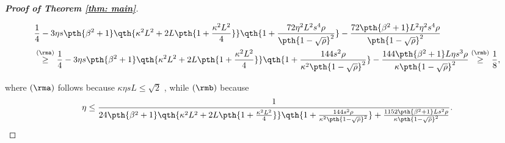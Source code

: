 \documentclass[letterpaper, 10 pt, conference]{ieeeconf}  %
\begin{document}
\begin{proof}[\bf Proof of Theorem \ref{thm: main}]
\begin{footnotesize}
\begin{align*}
    &\frac{1}{4} - 3\eta s\pth{\beta^2 + 1}\qth{\kappa^2 L^2 + 2 L \pth{1 + \frac{\kappa^2 L^2}{4}}}\qth{1 + \frac{72 \eta^2 L^2 s^4 \rho}{\pth{1-\sqrt{\rho}}^2}}-\frac{72 \pth{\beta^2 + 1} L^2 \eta^2 s^4 \rho}{\pth{1-\sqrt{\rho}}^2} \\
    &\overset{(\rma)}{\ge}\frac{1}{4} - 3\eta s\pth{\beta^2 + 1}\qth{\kappa^2 L^2 + 2 L \pth{1 + \frac{\kappa^2 L^2}{4}}}\qth{1 + \frac{144 s^2 \rho}{\kappa^2 \pth{1-\sqrt{\rho}}^2}}-\frac{144 \pth{\beta^2 + 1} L \eta s^3 \rho}{\kappa\pth{1-\sqrt{\rho}}^2}\overset{(\rmb)}{\ge} \frac{1}{8},
\end{align*}
\end{footnotesize}
where $(\rma)$ follows because $\kappa \eta s L \le \sqrt{2}$
, while $(\rmb)$ because 
\[
\eta \le \frac{1}{24\pth{\beta^2 + 1}\qth{\kappa^2 L^2 + 2 L \pth{1 + \frac{\kappa^2 L^2}{4}}}\qth{1 + \frac{144 s^2 \rho}{\kappa^2 \pth{1-\sqrt{\rho}}^2}}+\frac{1152 \pth{\beta^2 + 1} L s^2 \rho}{\kappa\pth{1-\sqrt{\rho}}^2}}.
\]


\end{proof}
\end{document}
